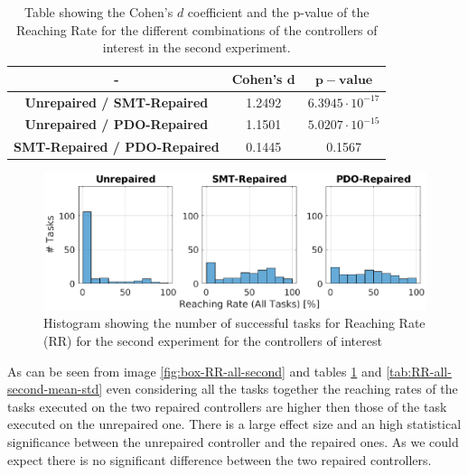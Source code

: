 \begin{table}[H]
    \centering
    \begin{tabular}{|c|c|c|}
        \hline
        - & \textbf{Cohen's} $\mathbf{d}$ & $\mathbf{p-value}$ \\
        \hline
        \textbf{Unrepaired / SMT-Repaired} & 1.2492 & $6.3945 \cdot 10^{-17}$ \\
        \textbf{Unrepaired / PDO-Repaired} & 1.1501 & $5.0207 \cdot 10^{-15}$ \\
        \textbf{SMT-Repaired / PDO-Repaired} & 0.1445 & 0.1567 \\
        \hline
    \end{tabular}
    \caption{Table showing the Cohen's $d$ coefficient and the p-value of the Reaching Rate for the different combinations of the controllers of interest in the second experiment.}
    \label{tab:RR-all-second-cohen-p}
\end{table}
\begin{figure}[H]
    \centering
    \includegraphics[width=\textwidth]{Images/second-experiment/exp1_RR_all_hist.eps}
    \caption{Histogram showing the number of successful tasks for Reaching Rate (RR) for the second experiment for the controllers of interest}
    \label{fig:hist-RR-all-second}
\end{figure}
As can be seen from image \ref{fig:box-RR-all-second} and tables \ref{tab:RR-all-second-cohen-p} and \ref{tab:RR-all-second-mean-std} even considering all the tasks together the reaching rates of the tasks executed on the two repaired controllers are higher then those of the task executed on the unrepaired one. There is a large effect size and an high statistical significance between the unrepaired controller and the repaired ones. As we could expect there is no significant difference between the two repaired controllers.
%
%
%
%
%
